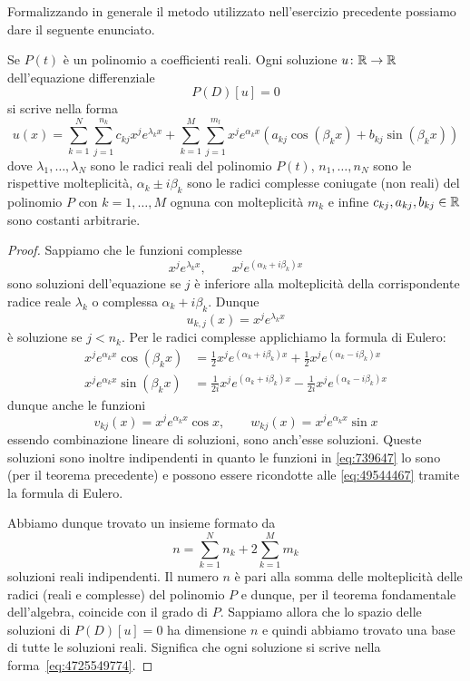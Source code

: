 Formalizzando in generale
il metodo utilizzato nell'esercizio precedente possiamo
dare il seguente enunciato.

\begin{theorem}
\mymark{**}
Se $P(t)$ è un polinomio a coefficienti reali.
Ogni soluzione
$u\colon \mathbb R\to \mathbb R$ dell'equazione differenziale
\[
  P(D) [u] = 0
\]
si scrive nella forma
\begin{equation}
\label{eq:4725549774}
  u(x) = \sum_{k=1}^N \sum_{j=1}^{n_k} c_{kj} x^j e^{\lambda_k x}
        + \sum_{k=1}^M \sum_{j=1}^{m_l} x^j e^{\alpha_k x} (a_{kj} \cos(\beta_k x) + b_{kj}\sin(\beta_k x))
\end{equation}
dove $\lambda_1, \dots, \lambda_N$ sono le radici reali del polinomio $P(t)$, $n_1, \dots, n_N$ sono le rispettive molteplicità,
$\alpha_k \pm i \beta_k$ sono le radici complesse coniugate (non reali) del polinomio $P$ con $k=1,\dots, M$ ognuna con molteplicità $m_k$ e infine $c_{kj}, a_{kj}, b_{kj}\in \mathbb R$ sono costanti arbitrarie.
\end{theorem}
%
\begin{proof}
Sappiamo che le funzioni complesse
\begin{equation}\label{eq:739647}
  x^j e^{\lambda_k x}, \qquad
  x^j e^{(\alpha_k+i\beta_k)x}
\end{equation}
sono soluzioni dell'equazione se $j$ è inferiore alla molteplicità della corrispondente radice reale $\lambda_k$ o complessa $\alpha_k + i \beta_k$.
Dunque
\[
  u_{k,j}(x) = x^j e^{\lambda_k x}
\]
è soluzione se $j<n_k$.
Per le radici complesse applichiamo la formula di Eulero:
\begin{align}\label{eq:49544467}
x^j e^{\alpha_k x}\cos (\beta_k x) &=
  \frac 1 2 x^j e^{(\alpha_k +i \beta_k)x}
  + \frac 1 2 x^j e^{(\alpha_k - i \beta_k)x}\\
x^j e^{\alpha_k x}\sin (\beta_k x) &=
    \frac 1 {2i} x^j e^{(\alpha_k +i \beta_k)x}
    - \frac 1 {2i} x^j e^{(\alpha_k - i \beta_k)x}
\end{align}
dunque anche le funzioni
\[
  v_{kj}(x) = x^j e^{\alpha_k x}\cos x, \qquad
  w_{kj}(x) = x^j e^{\alpha_k x}\sin x
\]
essendo combinazione lineare di soluzioni, sono anch'esse
soluzioni.
Queste soluzioni sono inoltre indipendenti in quanto
le funzioni in \eqref{eq:739647} lo sono (per il teorema precedente) e possono essere ricondotte alle \eqref{eq:49544467}
tramite la formula di Eulero.

Abbiamo dunque trovato un insieme formato da
\[
  n = \sum_{k=1}^N n_k + 2 \sum_{k=1}^M m_k
\]
soluzioni reali indipendenti. Il numero $n$ è pari alla somma delle molteplicità delle radici (reali e complesse) del polinomio $P$ e dunque, per il teorema fondamentale dell'algebra, coincide con il grado di $P$. Sappiamo allora che lo spazio delle soluzioni di $P(D)[u]=0$ ha dimensione $n$ e quindi abbiamo trovato una base di tutte le soluzioni reali. Significa che ogni soluzione si scrive nella forma~\eqref{eq:4725549774}.
\end{proof}


